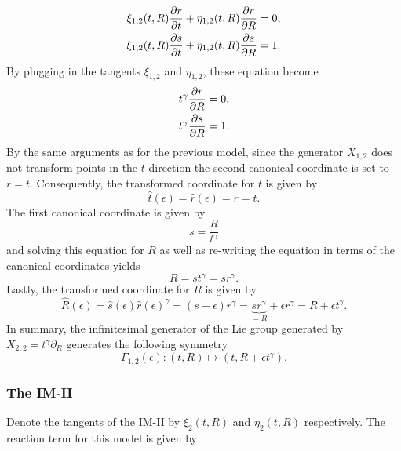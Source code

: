 \begin{align*}
\xi_{1,2}(t,R)\pdv{r}{t}+\eta_{1,2}(t,R)\pdv{r}{R}&=0,\\
\xi_{1,2}(t,R)\pdv{s}{t}+\eta_{1,2}(t,R)\pdv{s}{R}&=1.\\
\end{align*}
By plugging in the tangents $\xi_{1,2}$ and $\eta_{1,2}$, these equation become
\begin{align*}
t^{\gamma}\pdv{r}{R}&=0,\\
t^{\gamma}\pdv{s}{R}&=1.\\
\end{align*}
By the same arguments as for the previous model, since the generator $X_{1,2}$ does not transform points in the $t$-direction the second canonical coordinate is set to $r=t$. Consequently, the transformed coordinate for $t$ is given by
$$\hat{t}(\epsilon)=\hat{r}(\epsilon)=r=t.$$
The first canonical coordinate is given by
$$s=\dfrac{R}{t^{\gamma}}$$
and solving this equation for $R$ as well as re-writing the equation in terms of the canonical coordinates yields
$$R=st^{\gamma}=sr^{\gamma}.$$
Lastly, the transformed coordinate for $R$ is given by
$$\hat{R}(\epsilon)=\hat{s}(\epsilon)\hat{r}(\epsilon)^{\gamma}=(s+\epsilon)r^{\gamma}=\underset{=R}{\underbrace{sr^{\gamma}}}+\epsilon r^{\gamma}=R+\epsilon t^{\gamma}.$$
In summary, the infinitesimal generator of the Lie group generated by $X_{2,2}=t^{\gamma}\partial_R$ generates the following symmetry
$$\Gamma_{1,2}(\epsilon):(t,R)\mapsto (t,R+\epsilon t^{\gamma}).$$
\subsubsection{The IM-II}
Denote the tangents of the IM-II by $\xi_{2}(t,R)$ and $\eta_{2}(t,R)$ respectively. The reaction term for this model is given by

